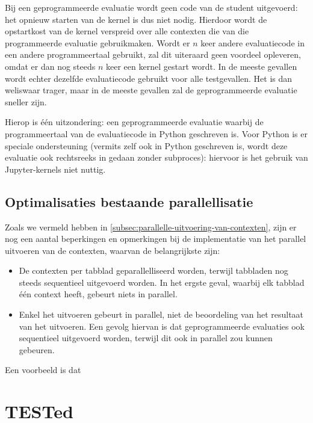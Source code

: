 Bij een geprogrammeerde evaluatie wordt geen code van de student uitgevoerd: het opnieuw starten van de kernel is dus niet nodig.
Hierdoor wordt de opstartkost van de kernel verspreid over alle contexten die van die programmeerde evaluatie gebruikmaken.
Wordt er $n$ keer andere evaluatiecode in een andere programmeertaal gebruikt, zal dit uiteraard geen voordeel opleveren, omdat er dan nog steeds $n$ keer een kernel gestart wordt.
In de meeste gevallen wordt echter dezelfde evaluatiecode gebruikt voor alle testgevallen.
Het  is dan weliswaar trager, maar in de meeste gevallen zal de geprogrammeerde evaluatie sneller zijn.

Hierop is één uitzondering: een geprogrammeerde evaluatie waarbij de programmeertaal van de evaluatiecode in Python geschreven is.
Voor Python is er speciale ondersteuning (vermits \tested{} zelf ook in Python geschreven is, wordt deze evaluatie ook rechtsreeks in \tested{} gedaan zonder subproces): hiervoor is het gebruik van Jupyter-kernels niet nuttig.

\subsection{Optimalisaties bestaande parallellisatie}\label{subsec:optimalisaties-bestaande-parallellisatie}

Zoals we vermeld hebben in \cref{subsec:parallelle-uitvoering-van-contexten}, zijn er nog een aantal beperkingen en opmerkingen bij de implementatie van het parallel uitvoeren van de contexten, waarvan de belangrijkste zijn:

\begin{itemize}
    \item De contexten per tabblad geparallelliseerd worden, terwijl tabbladen nog steeds sequentieel uitgevoerd worden.
    In het ergste geval, waarbij elk tabblad één context heeft, gebeurt niets in parallel.
    \item Enkel het uitvoeren gebeurt in parallel, niet de beoordeling van het resultaat van het uitvoeren.
    Een gevolg hiervan is dat geprogrammeerde evaluaties ook sequentieel uitgevoerd worden, terwijl dit ook in parallel zou kunnen gebeuren.
\end{itemize}
Een voorbeeld is dat

\section{TESTed}\label{sec:beperkingen-tested}

